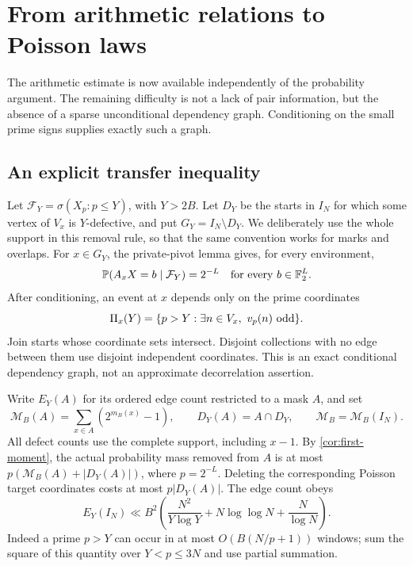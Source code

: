 \section{From arithmetic relations to Poisson laws}\label{sec:poisson-transfer}
The arithmetic estimate is now available independently of the probability
argument. The remaining difficulty is not a lack of pair information, but
the absence of a sparse unconditional dependency graph. Conditioning on the
small prime signs supplies exactly such a graph.

\subsection{An explicit transfer inequality}
Let $\mathcal F_Y=\sigma(X_p:p\le Y)$, with $Y>2B$. Let $D_Y$ be the
starts in $I_N$ for which some vertex of $V_x$ is $Y$-defective, and put
$G_Y=I_N\setminus D_Y$. We deliberately use the whole support in this
removal rule, so that the same convention works for marks and overlaps.
For $x\in G_Y$, the private-pivot lemma gives, for every environment,
\begin{equation}\label{eq:conditional-marginal}
 \mathbb P(A_xX=b\mid\mathcal F_Y)=2^{-L}
 \quad\hbox{for every }b\in\mathbb F_2^L.
\end{equation}
After conditioning, an event at $x$ depends only on the prime coordinates
\[
 \Pi_x(Y)=\{p>Y:\exists n\in V_x,\ v_p(n)\hbox{ odd}\}.
\]
Join starts whose coordinate sets intersect. Disjoint collections with no
edge between them use disjoint independent coordinates. This is an exact
conditional dependency graph, not an approximate decorrelation assertion.

Write $E_Y(A)$ for its ordered edge count restricted to a mask $A$, and set
\[
 \mathcal M_B(A)=\sum_{x\in A}(2^{m_B(x)}-1),\qquad
 D_Y(A)=A\cap D_Y,\qquad \mathcal M_B=\mathcal M_B(I_N).
\]
All defect counts use the complete support, including $x-1$.
By \cref{cor:first-moment}, the actual probability mass removed from $A$
is at most $p(\mathcal M_B(A)+|D_Y(A)|)$, where $p=2^{-L}$.
Deleting the corresponding Poisson target coordinates costs at most
$p|D_Y(A)|$.
The edge count obeys
\begin{equation}\label{eq:edge-count}
 E_Y(I_N)\ll B^2\left(\frac{N^2}{Y\log Y}
                   +N\log\log N+\frac N{\log N}\right).
\end{equation}
Indeed a prime $p>Y$ can occur in at most $O(B(N/p+1))$ windows;
sum the square of this quantity over $Y<p\le3N$ and use partial summation.

